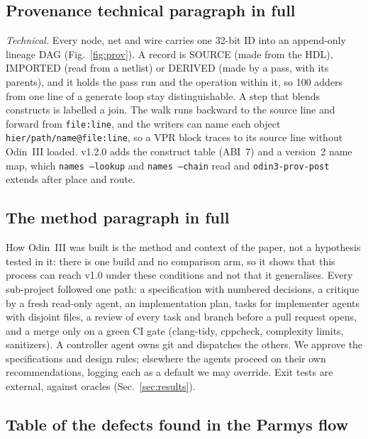 \documentclass[conference]{IEEEtran}
\newcommand{\code}[1]{\texttt{#1}}
\begin{document}
\subsection{Provenance technical paragraph in full}

\emph{Technical.} Every node, net and wire carries one 32-bit ID into an append-only lineage DAG (Fig.~\ref{fig:prov}). A record is SOURCE (made from the HDL), IMPORTED (read from a netlist) or DERIVED (made by a pass, with its parents), and it holds the pass run and the operation within it, so 100 adders from one line of a generate loop stay distinguishable. A step that blends constructs is labelled a join. The walk runs backward to the source line and forward from \code{file:line}, and the writers can name each object \code{hier/path/name@file:line}, so a VPR block traces to its source line without Odin~III loaded. v1.2.0 adds the construct table (ABI~7) and a version~2 name map, which \code{names --lookup} and \code{names --chain} read and \code{odin3-prov-post} extends after place and route.

\subsection{The method paragraph in full}

How Odin~III was built is the method and context of the paper, not a hypothesis tested in it: there is one build and no comparison arm, so it shows that this process can reach v1.0 under these conditions and not that it generalises. Every sub-project followed one path: a specification with numbered decisions, a critique by a fresh read-only agent, an implementation plan, tasks for implementer agents with disjoint files, a review of every task and branch before a pull request opens, and a merge only on a green CI gate (clang-tidy, cppcheck, complexity limits, sanitizers). A controller agent owns git and dispatches the others. We approve the specifications and design rules; elsewhere the agents proceed on their own recommendations, logging each as a default we may override. Exit tests are external, against oracles (Sec.~\ref{sec:results}).

\subsection{Table of the defects found in the Parmys flow}
\end{document}
